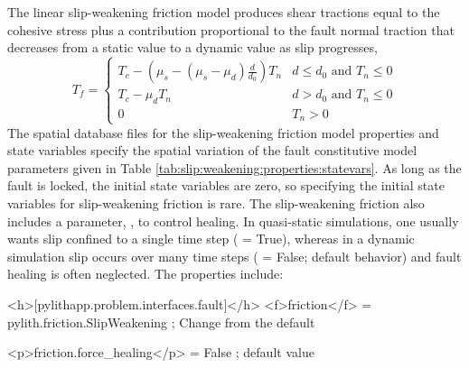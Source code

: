 The linear slip-weakening friction model produces shear tractions
equal to the cohesive stress plus a contribution proportional to the
fault normal traction that decreases from a static value to a dynamic
value as slip progresses,
\begin{equation}
T_{f}=\begin{cases}
T_{c}-(\mu_{s}-(\mu_{s}-\mu_{d})\frac{d}{d_{0}})T_{n} & d\leq d_{0}\text{ and }T_{n}\leq0\\
T_{c}-\mu_{d}T_{n} & d>d_{0}\text{ and }T_{n}\leq0\\
0 & T_{n}>0
\end{cases}
\end{equation}
The spatial database files for the slip-weakening friction model properties
and state variables specify the spatial variation of the fault constitutive
model parameters given in Table \vref{tab:slip:weakening:properties:statevars}.
As long as the fault is locked, the initial state variables are zero,
so specifying the initial state variables for slip-weakening friction
is rare. The slip-weakening friction also includes a parameter, ,
to control healing. In quasi-static simulations, one usually wants
slip confined to a single time step ( = True),
whereas in a dynamic simulation slip occurs over many time steps (
= False; default behavior) and fault healing is often neglected. The
properties include:
\begin{inventory}
\end{inventory}

\begin{cfg}
<h>[pylithapp.problem.interfaces.fault]</h>
<f>friction</f> = pylith.friction.SlipWeakening ; Change from the default

<p>friction.force_healing</p> = False ; default value
\end{cfg}

